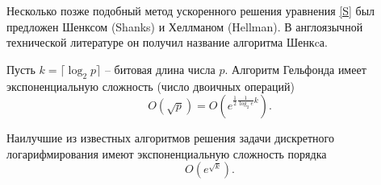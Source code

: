 Несколько позже подобный метод ускоренного решения уравнения \ref{S} был предложен Шенксом (Shanks) и Хеллманом (Hellman). В англоязычной технической литературе он получил название алгоритма Шенкcа.

Пусть $k = \lceil \log_2 p \rceil$ -- битовая длина числа $p$. Алгоритм Гельфонда имеет экспоненциальную сложность (число двоичных операций)
    \[ O(\sqrt{p}) = O(e^{\frac{1}{2} \frac{1}{\log_2 e} k}). \]

Наилучшие из известных алгоритмов решения задачи дискретного логарифмирования имеют экспоненциальную сложность порядка
    \[ O(e^{\sqrt{k}}). \]
